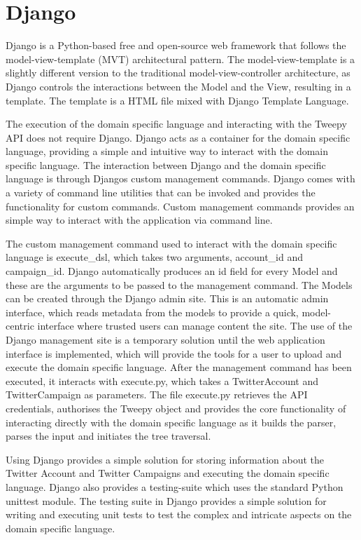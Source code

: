 \section{Django}

Django is a Python-based free and open-source web framework that follows the model-view-template (MVT) architectural pattern. The model-view-template is a slightly different version to the traditional model-view-controller architecture, as Django controls the interactions between the Model and the View, resulting in a template. The template is a HTML file mixed with Django Template Language. \newline \par

The execution of the domain specific language and interacting with the Tweepy API does not require Django. Django acts as a container for the domain specific language, providing a simple and intuitive way to interact with the domain specific language. The interaction between Django and the domain specific language is through Djangos custom management commands. Django comes with a variety of command line utilities that can be invoked and provides the functionality for custom commands. Custom management commands provides an simple way to interact with the application via command line. \newline \par

The custom management command used to interact with the domain specific language is execute\_dsl, which takes two arguments, account\_id and campaign\_id. Django automatically produces an id field for every Model and these are the arguments to be passed to the management command. The Models can be created through the Django admin site. This is an automatic admin interface, which reads metadata from the models to provide a quick, model-centric interface where trusted users can manage content the site. The use of the Django management site is a temporary solution until the web application interface is implemented, which will provide the tools for a user to upload and execute the domain specific language. After the management command has been executed, it interacts with execute.py, which takes a TwitterAccount and TwitterCampaign as parameters. The file execute.py retrieves the API credentials, authorises the Tweepy object and provides the core functionality of interacting directly with the domain specific language as it builds the parser, parses the input and initiates the tree traversal. \newline \par

Using Django provides a simple solution for storing information about the Twitter Account and Twitter Campaigns and executing the domain specific language. Django also provides a testing-suite which uses the standard Python unittest module. The testing suite in Django provides a simple solution for writing and executing unit tests to test the complex and intricate aspects on the domain specific language. \newline \par